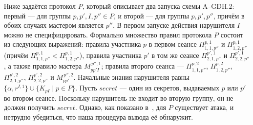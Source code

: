 Ниже задаётся протокол $P$, который описывает два запуска схемы A--GDH.2: первый —
для группы $p,p',I,p''\in P$, и второй — для группы $p,p',p''$, причём в
обоих случаях мастером является $p''$. В первом запуске действия
нарушителя $I$ можно не специфицировать. Формально множество правил
протокола $P$ состоит из следующих выражений: правила участника $p$ в
первом сеансе $\Pi^{p,1}_{1,1,p''}$ и $\Pi^{p,1}_{1,2,p''}$ (причём
$\Pi^{p,1}_{1,1,p''}<\Pi^{p,1}_{1,2,p''}$), правила участника $p'$ в том же
сеансе $\Pi^{p',1}_{2,1,p''}$ и $\Pi^{p',1}_{2,2,p''}$, а также правило
мастера $M^{\,p'',1}_{pp'I}$; правила второго сеанса —
$\Pi^{p,2}_{1,1,p''}$, $\Pi^{p,2}_{1,2,p''}$, $\Pi^{p',2}_{2,1,p''}$,
$\Pi^{p',2}_{2,2,p''}$ и $M^{\,p'',2}_{pp'}$.  Начальные знания нарушителя
равны $\{\alpha,r^{I,1}\}\cup\{K_{pI}\mid p\in P\}$.  Пусть
$\mathit{secret}$ — один из секретов, выдаваемых $p$ или $p'$ во втором
сеансе.  Поскольку нарушитель не входит во вторую группу, он не должен
получить $\mathit{secret}$. Однако, как показано в~\cite{PereiraQuisquater2001},
для $P$ существует атака, и нетрудно убедиться, что наша процедура
вывода её обнаружит.
